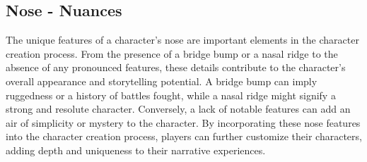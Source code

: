\documentclass[12pt]{book}
\begin{document}
\subsection{\textbf{Nose - Nuances}}

The unique features of a character's nose are important elements in the character creation process. From the presence of a bridge bump or a nasal ridge to the absence of any pronounced features, these details contribute to the character's overall appearance and storytelling potential. A bridge bump can imply ruggedness or a history of battles fought, while a nasal ridge might signify a strong and resolute character. Conversely, a lack of notable features can add an air of simplicity or mystery to the character. By incorporating these nose features into the character creation process, players can further customize their characters, adding depth and uniqueness to their narrative experiences.
\end{document}
